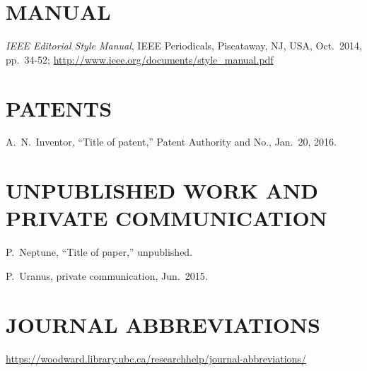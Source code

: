 \section{MANUAL}

\begin{thebibliography}{99} %
	\setcounter{enumi}{16}
		\emph{IEEE Editorial Style Manual},
		IEEE Periodicals,
		Piscataway, NJ, USA, Oct.\ 2014, pp.\ 34-52;
		\url{http://www.ieee.org/documents/style_manual.pdf} 
\end{thebibliography}

\section{PATENTS}

\begin{thebibliography}{99} %
	\setcounter{enumi}{17}
		A.~N.~Inventor,
		“Title of patent,”
		Patent Authority and No., Jan.\ 20, 2016.

\end{thebibliography}

\section{UNPUBLISHED WORK AND PRIVATE COMMUNICATION}

\begin{thebibliography}{99} %
	\setcounter{enumi}{18}
		P.~Neptune, “Title of paper,” unpublished.
	
	P.~Uranus, private communication, Jun.\ 2015.
\end{thebibliography}

\newpage

\section{JOURNAL ABBREVIATIONS}

\begin{thebibliography}{99} %
	\setcounter{enumi}{20}
		\url{https://woodward.library.ubc.ca/researchhelp/journal-abbreviations/}

\end{thebibliography}


